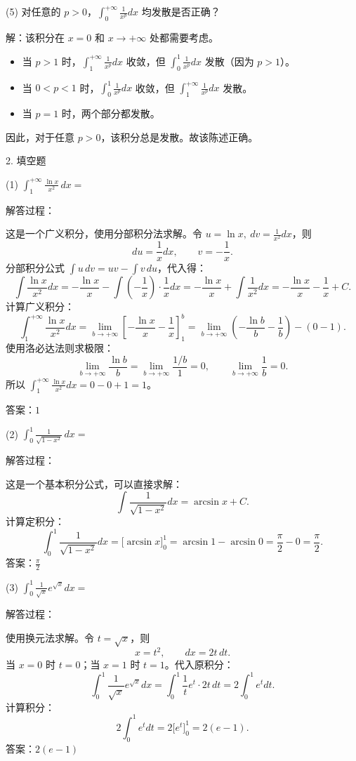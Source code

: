(5) 对任意的 \(p>0\)，\(\int_{0}^{+\infty}\frac{1}{x^{p}}dx\) 均发散是否正确？

解：该积分在 \(x=0\) 和 \(x\to+\infty\) 处都需要考虑。
\begin{itemize}
\item 当 \(p>1\) 时，\(\int_{1}^{+\infty}\frac{1}{x^{p}}dx\) 收敛，但 \(\int_{0}^{1}\frac{1}{x^{p}}dx\) 发散（因为 \(p>1\)）。
\item 当 \(0<p<1\) 时，\(\int_{0}^{1}\frac{1}{x^{p}}dx\) 收敛，但 \(\int_{1}^{+\infty}\frac{1}{x^{p}}dx\) 发散。
\item 当 \(p=1\) 时，两个部分都发散。
\end{itemize}
因此，对于任意 \(p>0\)，该积分总是发散。故该陈述正确。

2. 填空题

(1) \(\int_{1}^{+\infty}\frac{\ln x}{x^{2}}\,dx=\)

解答过程：

这是一个广义积分，使用分部积分法求解。令 \(u=\ln x,\ dv=\frac{1}{x^{2}}dx\)，则
\[ du=\frac{1}{x}dx,\qquad v=-\frac{1}{x}. \]
分部积分公式 \(\int u\,dv=uv-\int v\,du\)，代入得：
\[ \int\frac{\ln x}{x^{2}}dx=-\frac{\ln x}{x}-\int\left(-\frac{1}{x}\right)\cdot\frac{1}{x}dx=-\frac{\ln x}{x}+\int\frac{1}{x^{2}}dx=-\frac{\ln x}{x}-\frac{1}{x}+C. \]
计算广义积分：
\[ \int_{1}^{+\infty}\frac{\ln x}{x^{2}}dx=\lim_{b\to+\infty}\left[-\frac{\ln x}{x}-\frac{1}{x}\right]_{1}^{b}=\lim_{b\to+\infty}\left(-\frac{\ln b}{b}-\frac{1}{b}\right)-\left(0-1\right). \]
使用洛必达法则求极限：
\[ \lim_{b\to+\infty}\frac{\ln b}{b}=\lim_{b\to+\infty}\frac{1/b}{1}=0,\qquad \lim_{b\to+\infty}\frac{1}{b}=0. \]
所以 \(\int_{1}^{+\infty}\frac{\ln x}{x^{2}}dx=0-0+1=1\)。

答案：\(1\)

(2) \(\int_{0}^{1}\frac{1}{\sqrt{1-x^{2}}}\,dx=\)

解答过程：

这是一个基本积分公式，可以直接求解：
\[ \int\frac{1}{\sqrt{1-x^{2}}}dx=\arcsin x+C. \]
计算定积分：
\[ \int_{0}^{1}\frac{1}{\sqrt{1-x^{2}}}dx=\big[\arcsin x\big]_{0}^{1}=\arcsin1-\arcsin0=\frac{\pi}{2}-0=\frac{\pi}{2}. \]
答案：\(\frac{\pi}{2}\)

(3) \(\int_{0}^{1}\frac{1}{\sqrt{x}}e^{\sqrt{x}}dx=\)

解答过程：

使用换元法求解。令 \(t=\sqrt{x}\)，则
\[ x=t^{2},\qquad dx=2t\,dt. \]
当 \(x=0\) 时 \(t=0\)；当 \(x=1\) 时 \(t=1\)。代入原积分：
\[ \int_{0}^{1}\frac{1}{\sqrt{x}}e^{\sqrt{x}}dx=\int_{0}^{1}\frac{1}{t}e^{t}\cdot2t\,dt=2\int_{0}^{1}e^{t}dt. \]
计算积分：
\[ 2\int_{0}^{1}e^{t}dt=2\big[e^{t}\big]_{0}^{1}=2(e-1). \]
答案：\(2(e-1)\)

